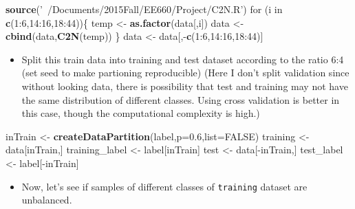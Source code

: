 \documentclass[]{article}
\newenvironment{Shaded}{\begin{snugshade}}{\end{snugshade}}
\newcommand{\KeywordTok}[1]{\textcolor[rgb]{0.13,0.29,0.53}{\textbf{{#1}}}}
\newcommand{\DataTypeTok}[1]{\textcolor[rgb]{0.13,0.29,0.53}{{#1}}}
\newcommand{\DecValTok}[1]{\textcolor[rgb]{0.00,0.00,0.81}{{#1}}}
\newcommand{\FloatTok}[1]{\textcolor[rgb]{0.00,0.00,0.81}{{#1}}}
\newcommand{\StringTok}[1]{\textcolor[rgb]{0.31,0.60,0.02}{{#1}}}
\newcommand{\OtherTok}[1]{\textcolor[rgb]{0.56,0.35,0.01}{{#1}}}
\newcommand{\NormalTok}[1]{{#1}}
\begin{document}
\begin{Shaded}
\begin{Highlighting}[]
\KeywordTok{source}\NormalTok{(}\StringTok{'~/Documents/2015Fall/EE660/Project/C2N.R'}\NormalTok{)}
\NormalTok{for (i in }\KeywordTok{c}\NormalTok{(}\DecValTok{1}\NormalTok{:}\DecValTok{6}\NormalTok{,}\DecValTok{14}\NormalTok{:}\DecValTok{16}\NormalTok{,}\DecValTok{18}\NormalTok{:}\DecValTok{44}\NormalTok{))\{}
    \NormalTok{temp <-}\StringTok{ }\KeywordTok{as.factor}\NormalTok{(data[,i])}
    \NormalTok{data <-}\StringTok{ }\KeywordTok{cbind}\NormalTok{(data,}\KeywordTok{C2N}\NormalTok{(temp))}
\NormalTok{\}}
\NormalTok{data <-}\StringTok{ }\NormalTok{data[,-}\KeywordTok{c}\NormalTok{(}\DecValTok{1}\NormalTok{:}\DecValTok{6}\NormalTok{,}\DecValTok{14}\NormalTok{:}\DecValTok{16}\NormalTok{,}\DecValTok{18}\NormalTok{:}\DecValTok{44}\NormalTok{)]    }
\end{Highlighting}
\end{Shaded}

\begin{itemize}
\itemsep1pt\parskip0pt
\item
  Split this train data into training and test dataset according to the
  ratio 6:4 (set seed to make partioning reproducible) (Here I don't
  split validation since without looking data, there is possibility that
  test and training may not have the same distribution of different
  classes. Using cross validation is better in this case, though the
  computational complexity is high.)
\end{itemize}

\begin{Shaded}
\begin{Highlighting}[]
\NormalTok{inTrain <-}\StringTok{ }\KeywordTok{createDataPartition}\NormalTok{(label,}\DataTypeTok{p=}\FloatTok{0.6}\NormalTok{,}\DataTypeTok{list=}\OtherTok{FALSE}\NormalTok{)}
\NormalTok{training <-}\StringTok{ }\NormalTok{data[inTrain,]}
\NormalTok{training_label <-}\StringTok{ }\NormalTok{label[inTrain]}
\NormalTok{test <-}\StringTok{ }\NormalTok{data[-inTrain,]}
\NormalTok{test_label <-}\StringTok{ }\NormalTok{label[-inTrain]}
\end{Highlighting}
\end{Shaded}

\begin{itemize}
\itemsep1pt\parskip0pt
\item
  Now, let's see if samples of different classes of \texttt{training}
  dataset are unbalanced.
\end{itemize}
\end{document}
